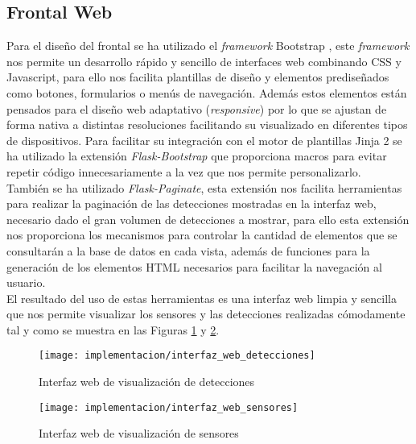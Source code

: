 \documentclass[../proyecto.tex]{subfiles}
\begin{document}
\subsection{Frontal Web}

Para el diseño del frontal se ha utilizado el \textit{framework} Bootstrap \cite{bootstrap_frontend_framework}, este \textit{framework} nos permite un desarrollo rápido y sencillo de interfaces web combinando CSS y Javascript, para ello nos facilita plantillas de diseño y elementos prediseñados como botones, formularios o menús de navegación. Además estos elementos están pensados para el diseño web adaptativo (\textit{responsive}) por lo que se ajustan de forma nativa a distintas resoluciones facilitando su visualizado en diferentes tipos de dispositivos. Para facilitar su integración con el motor de plantillas Jinja 2 se ha utilizado la extensión \textit{Flask-Bootstrap} \cite{flask_bootstrap} que proporciona macros para evitar repetir código innecesariamente a la vez que nos permite personalizarlo.\\

También se ha utilizado \textit{Flask-Paginate}, esta extensión nos facilita herramientas para realizar la paginación de las detecciones mostradas en la interfaz web, necesario dado el gran volumen de detecciones a mostrar, para ello esta extensión nos proporciona los mecanismos para controlar la cantidad de elementos que se consultarán a la base de datos en cada vista, además de funciones para la generación de los elementos HTML necesarios para facilitar la navegación al usuario. \\

El resultado del uso de estas herramientas es una interfaz web limpia y sencilla que nos permite visualizar los sensores y las detecciones realizadas cómodamente tal y como se muestra en las Figuras \ref{fig:interfaz_web_detecciones} y \ref{fig:interfaz_web_sensores}.\\

\begin{figure}[H]
\centering
\texttt{[image: implementacion/interfaz\_web\_detecciones]}
\caption{Interfaz web de visualización de detecciones}
\label{fig:interfaz_web_detecciones}
\end{figure}

\begin{figure}[H]
\centering
\texttt{[image: implementacion/interfaz\_web\_sensores]}
\caption{Interfaz web de visualización de sensores}
\label{fig:interfaz_web_sensores}
\end{figure}
\end{document}
